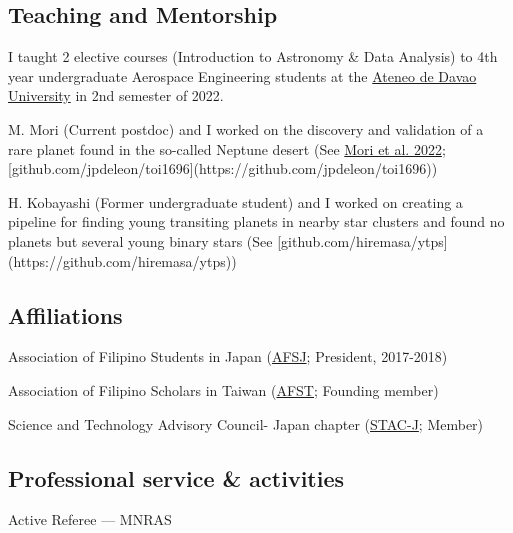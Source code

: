 \documentclass[12pt,letterpaper]{article}
\begin{document}
\subsection{Teaching and Mentorship}
\begin{list}{}{\cvlist}
    \item I taught 2 elective courses (Introduction to Astronomy \& Data Analysis) to 4th year undergraduate Aerospace Engineering students at the \href{http://sea.addu.edu.ph/programs/aerospace-engineering/}{Ateneo de Davao University} in 2nd semester of 2022. \\
    \item M. Mori (Current postdoc) and I worked on the discovery and validation of a rare planet found in the so-called Neptune desert (See \href{https://ui.adsabs.harvard.edu/abs/2022AJ....163..298M/abstract}{Mori et al. 2022}; [github.com/jpdeleon/toi1696](https://github.com/jpdeleon/toi1696))
    \item H. Kobayashi (Former undergraduate student) and I worked on creating a pipeline for finding young transiting planets in nearby star clusters and found no planets but several young binary stars (See [github.com/hiremasa/ytps](https://github.com/hiremasa/ytps))
\end{list}

\subsection{Affiliations}
\begin{list}{}{\cvlist}
    \item Association of Filipino Students in Japan (\href{https://www.facebook.com/afsjpage/}{AFSJ}; President, 2017-2018)
    \item Association of Filipino Scholars in Taiwan  (\href{https://www.facebook.com/AssocIskolar/}{AFST}; Founding member)
    \item Science and Technology Advisory Council- Japan chapter (\href{https://www.facebook.com/profile.php?id=100083271798519}{STAC-J}; Member)
\end{list}

\subsection{Professional service \& activities}
\begin{list}{}{\cvlist}
  \item Active Referee ---
        MNRAS
\end{list}
\end{document}
